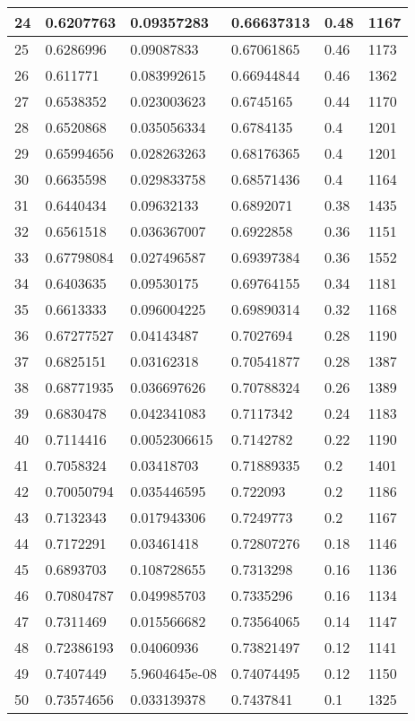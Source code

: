 \begin{longtable}{|l|l|l|l|l|l|}
24 & 0.6207763 & 0.09357283 & 0.66637313 & 0.48 & 1167 \\ \hline 
25 & 0.6286996 & 0.09087833 & 0.67061865 & 0.46 & 1173 \\ \hline 
26 & 0.611771 & 0.083992615 & 0.66944844 & 0.46 & 1362 \\ \hline 
27 & 0.6538352 & 0.023003623 & 0.6745165 & 0.44 & 1170 \\ \hline 
28 & 0.6520868 & 0.035056334 & 0.6784135 & 0.4 & 1201 \\ \hline 
29 & 0.65994656 & 0.028263263 & 0.68176365 & 0.4 & 1201 \\ \hline 
30 & 0.6635598 & 0.029833758 & 0.68571436 & 0.4 & 1164 \\ \hline 
31 & 0.6440434 & 0.09632133 & 0.6892071 & 0.38 & 1435 \\ \hline 
32 & 0.6561518 & 0.036367007 & 0.6922858 & 0.36 & 1151 \\ \hline 
33 & 0.67798084 & 0.027496587 & 0.69397384 & 0.36 & 1552 \\ \hline 
34 & 0.6403635 & 0.09530175 & 0.69764155 & 0.34 & 1181 \\ \hline 
35 & 0.6613333 & 0.096004225 & 0.69890314 & 0.32 & 1168 \\ \hline 
36 & 0.67277527 & 0.04143487 & 0.7027694 & 0.28 & 1190 \\ \hline 
37 & 0.6825151 & 0.03162318 & 0.70541877 & 0.28 & 1387 \\ \hline 
38 & 0.68771935 & 0.036697626 & 0.70788324 & 0.26 & 1389 \\ \hline 
39 & 0.6830478 & 0.042341083 & 0.7117342 & 0.24 & 1183 \\ \hline 
40 & 0.7114416 & 0.0052306615 & 0.7142782 & 0.22 & 1190 \\ \hline 
41 & 0.7058324 & 0.03418703 & 0.71889335 & 0.2 & 1401 \\ \hline 
42 & 0.70050794 & 0.035446595 & 0.722093 & 0.2 & 1186 \\ \hline 
43 & 0.7132343 & 0.017943306 & 0.7249773 & 0.2 & 1167 \\ \hline 
44 & 0.7172291 & 0.03461418 & 0.72807276 & 0.18 & 1146 \\ \hline 
45 & 0.6893703 & 0.108728655 & 0.7313298 & 0.16 & 1136 \\ \hline 
46 & 0.70804787 & 0.049985703 & 0.7335296 & 0.16 & 1134 \\ \hline 
47 & 0.7311469 & 0.015566682 & 0.73564065 & 0.14 & 1147 \\ \hline 
48 & 0.72386193 & 0.04060936 & 0.73821497 & 0.12 & 1141 \\ \hline 
49 & 0.7407449 & 5.9604645e-08 & 0.74074495 & 0.12 & 1150 \\ \hline 
50 & 0.73574656 & 0.033139378 & 0.7437841 & 0.1 & 1325 \\ \hline 
\end{longtable}